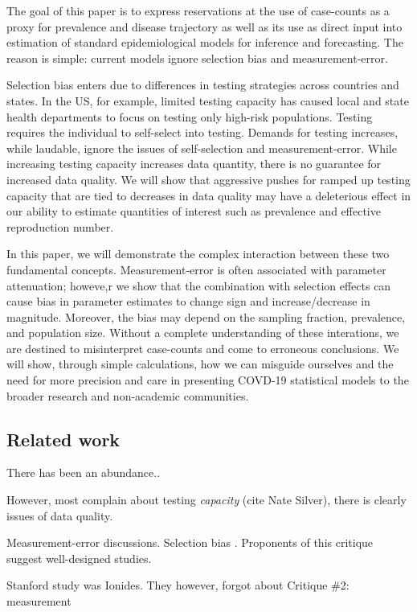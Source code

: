 \documentclass[11pt]{amsart}
\begin{document}
The goal of this paper is to express reservations at the use of case-counts as a proxy for prevalence and disease trajectory as well as its use as direct input into estimation of standard epidemiological models for inference and forecasting.  The reason is simple: current models ignore selection bias and measurement-error.

Selection bias enters due to differences in testing strategies across countries and states.  In the US, for example, limited testing capacity has caused local and state health departments to focus on testing only  high-risk populations.  Testing requires the individual to self-select into testing.  Demands for testing increases, while laudable, ignore the issues of self-selection and measurement-error. While increasing testing capacity increases data quantity, there is no guarantee for increased data quality.  We will show that aggressive pushes for ramped up testing capacity that are tied to decreases in data quality may have a deleterious effect in our ability to estimate quantities of interest such as prevalence and effective reproduction number.

In this paper, we will demonstrate the complex interaction between these two fundamental concepts.  Measurement-error is often associated with parameter attenuation; howeve,r we show that the combination with selection effects can cause bias in parameter estimates to change sign and increase/decrease in magnitude.  Moreover, the bias may depend on the sampling fraction, prevalence, and population size.  Without a complete understanding of these interations, we are destined to misinterpret case-counts and come to erroneous conclusions.   We will show, through simple calculations, how we can misguide ourselves and the need for more precision and care in presenting COVD-19 statistical models to the broader research and non-academic communities.

\subsection{Related work}

There has been an abundance..

However, most complain about testing \emph{capacity} (cite Nate Silver), there is clearly issues of data quality.

Measurement-error discussions.
Selection bias . Proponents of this critique suggest well-designed studies.

Stanford study was Ionides.  They however, forgot about Critique \#2: measurement
\end{document}
